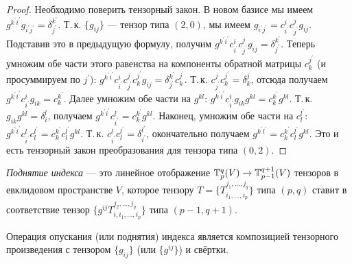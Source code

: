 \begin{proof}
    Необходимо поверить тензорный закон. В новом базисе мы имеем $g^{k^\prime i^\prime}g_{i^\prime j^\prime} = \delta^{k^\prime}_{j^\prime}$. Т.\,к. $\{g_{ij}\}$ --- тензор типа $(2, 0)$, мы имеем $g_{i^\prime j^\prime} = c^i_{i^\prime}c^j_{j^\prime}g_{ij}$. Подставив это в предыдущую формулу, получим $g^{k^\prime i^\prime}c^i_{i^\prime}c^j_{j^\prime}g_{ij} = \delta^{k^\prime}_{j^\prime}$. Теперь умножим обе части этого равенства на компоненты обратной матрицы $c^{j^\prime}_k$ (и просуммируем по $j^\prime$): $g^{k^\prime i^\prime}c^i_{i^\prime}c^j_{j^\prime}c^{j^\prime}_kg_{ij} = \delta^{k^\prime}_{j^\prime}c^{j^\prime}_k$. Т.\,к. $c^j_{j^\prime}c^{j^\prime}_k = \delta^j_k$, отсюда получаем $g^{k^\prime i^\prime}c^i_{i^\prime}g_{ik} = c^{k^\prime}_k$. Далее умножим обе части на $g^{kl}$: $g^{k^\prime i^\prime}c^i_{i^\prime}g_{ik}g^{kl} = c^{k^\prime}_kg^{kl}$. Т.\,к. $g_{ik}g^{kl} = \delta^l_i$, получаем $g^{k^\prime i^\prime}c^l_{i^\prime} = c^{k^\prime}_kg^{kl}$. Наконец, умножим обе части на $c^{l^\prime}_l$: $g^{k^\prime i^\prime}c^l_{i^\prime}c^{l^\prime}_l = c^{k^\prime}_kc^{l^\prime}_lg^{kl}$. Т.\,к. $c^l_{i^\prime}c^{l^\prime}_l = \delta^{l^\prime}_{i^\prime}$, окончательно получаем $g^{k^\prime l^\prime} = c^{k^\prime}_kc^{l^\prime}_lg^{kl}$. Это и есть тензорный закон преобразования для тензора типа $(0, 2)$.
\end{proof}

\begin{definition}
    \textit{Поднятие индекса} --- это линейное отображение $\mathbb{T}_p^q(V) \to \mathbb{T}_{p - 1}^{q + 1}(V)$ тензоров в евклидовом пространстве $V$, которое тензору $T = \{T_{i_1, \ldots, i_p}^{j_1, \ldots, j_q}\}$ типа $(p, q)$ ставит в соответствие тензор $\{g^{ij}T_{i, i_1, \ldots, i_p}^{j_2, \ldots, j_q}\}$ типа $(p - 1, q + 1)$.
\end{definition}

Операция опускания (или поднятия) индекса является композицией тензорного произведения с тензором $\{g_{ij}\}$ (или $\{g^{ij}\}$) и свёртки.

